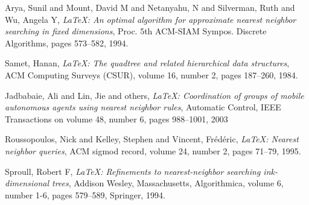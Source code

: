 \documentclass[ijoc,nonblindrev]{informs3} %
\begin{document}
%
%
%



\begin{thebibliography}{9}

  Arya, Sunil and Mount, David M and Netanyahu, N and Silverman, Ruth and Wu, Angela Y,
  \emph{\LaTeX: An optimal algorithm for approximate nearest neighbor searching in fixed dimensions},
  Proc. 5th ACM-SIAM Sympos. Discrete Algorithms,
  pages 573--582,
  1994.

  Samet, Hanan,
  \emph{\LaTeX: The quadtree and related hierarchical data structures},
  ACM Computing Surveys (CSUR),
  volume 16, number 2, pages 187--260,
  1984.

  Jadbabaie, Ali and Lin, Jie and others,
  \emph{\LaTeX: Coordination of groups of mobile autonomous agents using nearest neighbor rules},
  Automatic Control, IEEE Transactions on
  volume 48, number 6, pages 988--1001,
  2003

  Roussopoulos, Nick and Kelley, Stephen and Vincent, Fr{\'e}d{\'e}ric,
  \emph{\LaTeX: Nearest neighbor queries},
  ACM sigmod record,
  volume 24, number 2, pages 71--79,
  1995.

  Sproull, Robert F,
  \emph{\LaTeX: Refinements to nearest-neighbor searching ink-dimensional trees},
  Addison Wesley, Massachusetts,
  Algorithmica, volume 6, number 1-6, pages 579--589, Springer,
  1994.

\end{thebibliography}

\end{document}

